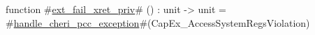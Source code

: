 function #\hyperref[sailRISCVzextzyfailzyxretzypriv]{ext\_fail\_xret\_priv}# () : unit -> unit = 
  #\hyperref[sailRISCVzhandlezycherizypcczyexception]{handle\_cheri\_pcc\_exception}#(CapEx_AccessSystemRegsViolation)
